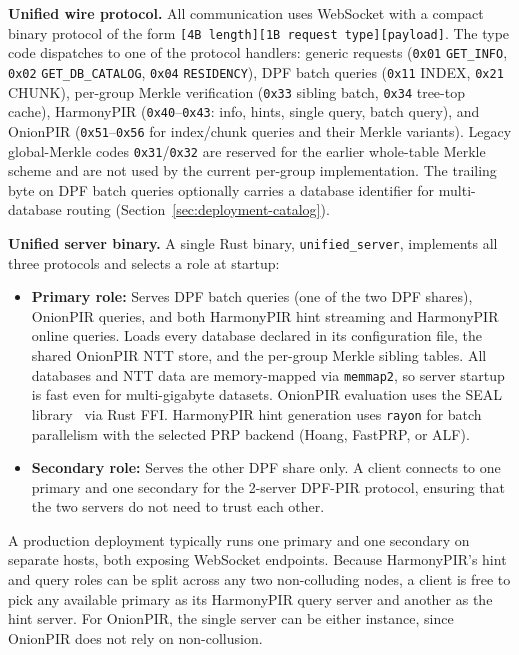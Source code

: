 \textbf{Unified wire protocol.} All communication uses WebSocket with a compact binary protocol of the form \texttt{[4B length][1B request type][payload]}. The type code dispatches to one of the protocol handlers: generic requests (\texttt{0x01} \texttt{GET\_INFO}, \texttt{0x02} \texttt{GET\_DB\_CATALOG}, \texttt{0x04} \texttt{RESIDENCY}), DPF batch queries (\texttt{0x11} INDEX, \texttt{0x21} CHUNK), per-group Merkle verification (\texttt{0x33} sibling batch, \texttt{0x34} tree-top cache), HarmonyPIR (\texttt{0x40}--\texttt{0x43}: info, hints, single query, batch query), and OnionPIR (\texttt{0x51}--\texttt{0x56} for index/chunk queries and their Merkle variants). Legacy global-Merkle codes \texttt{0x31}/\texttt{0x32} are reserved for the earlier whole-table Merkle scheme and are not used by the current per-group implementation. The trailing byte on DPF batch queries optionally carries a database identifier for multi-database routing (Section~\ref{sec:deployment-catalog}).

\textbf{Unified server binary.} A single Rust binary, \texttt{unified\_server}, implements all three protocols and selects a role at startup:
\begin{itemize}[nolistsep,leftmargin=*]
    \item \textbf{Primary role:} Serves DPF batch queries (one of the two DPF shares), OnionPIR queries, and both HarmonyPIR hint streaming and HarmonyPIR online queries. Loads every database declared in its configuration file, the shared OnionPIR NTT store, and the per-group Merkle sibling tables. All databases and NTT data are memory-mapped via \texttt{memmap2}, so server startup is fast even for multi-gigabyte datasets. OnionPIR evaluation uses the SEAL library~\cite{seal} via Rust FFI. HarmonyPIR hint generation uses \texttt{rayon} for batch parallelism with the selected PRP backend (Hoang, FastPRP, or ALF).
    \item \textbf{Secondary role:} Serves the other DPF share only. A client connects to one primary and one secondary for the 2-server DPF-PIR protocol, ensuring that the two servers do not need to trust each other.
\end{itemize}
A production deployment typically runs one primary and one secondary on separate hosts, both exposing WebSocket endpoints. Because HarmonyPIR's hint and query roles can be split across any two non-colluding nodes, a client is free to pick any available primary as its HarmonyPIR query server and another as the hint server. For OnionPIR, the single server can be either instance, since OnionPIR does not rely on non-collusion.


